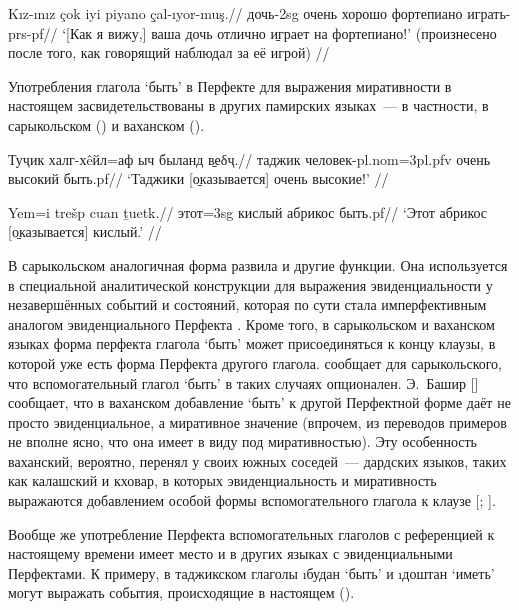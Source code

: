 {{{
\begingl
\gla Kız-ınız çok iyi piyano \b{çal-ıyor-muş}.//
\glc дочь-{\sc 2sg} очень хорошо фортепиано играть-{\sc prs-pf}//
\glft ‘[Как я вижу,] ваша дочь отлично \b{играет} на фортепиано!’ (произнесено после того, как говорящий наблюдал за её игрой) //
\endgl \xe

Употребления глагола ‘быть’ в Перфекте для выражения миративности в настоящем засвидетельствованы в других памирских языках~— в частности, в сарыкольском () и ваханском ().

\begingl
\gla Туҷик халг-хêйл=аф ыч быланд \b{веδҷ}.//
\glc таджик человек-{\sc pl.nom=3pl.pfv} очень высокий быть.{\sc pf}//
\glft ‘Таджики [\b{оказывается}] очень высокие!’ //
\endgl \xe

\begingl
\gla Yem=i trešp cuan \b{tuetk}.//
\glc этот={\sc 3sg} кислый абрикос быть.{\sc pf}//
\glft ‘Этот абрикос [\b{оказывается}] кислый.’ //
\endgl \xe

В сарыкольском аналогичная форма развила и другие функции. Она используется в специальной аналитической конструкции для выражения эвиденциальности у незавершённых событий и состояний, которая по сути стала имперфективным аналогом эвиденциального Перфекта \parencite[94–95]{palmer2016}. Кроме того, в сарыкольском и ваханском языках форма перфекта глагола ‘быть’ может присоединяться к концу клаузы, в которой уже есть форма Перфекта другого глагола. \parencite[323]{kim2017} сообщает для сарыкольского, что вспомогательный глагол ‘быть’ в таких случаях опционален. Э.~Башир [\cite*[7–8]{bashir2006}] сообщает, что в ваханском добавление ‘быть’ к другой Перфектной форме даёт не просто эвиденциальное, а миративное значение (впрочем, из переводов примеров не вполне ясно, что она имеет в виду под миративностью). Эту особенность ваханский, вероятно, перенял у своих южных соседей~— дардских языков, таких как калашский и кховар, в которых эвиденциальность и миративность выражаются добавлением особой формы вспомогательного глагола к клаузе [\cite{bashir2006}; \cite*{bashir2010}].

Вообще же употребление Перфекта вспомогательных глаголов с референцией к настоящему времени имеет место и в других языках с эвиденциальными Перфектами. К примеру, в таджикском глаголы \i{будан} ‘быть’ и \i{доштан} ‘иметь’ могут выражать события, происходящие в настоящем \parencite[87–90]{nilsson2022} ().

}}}
